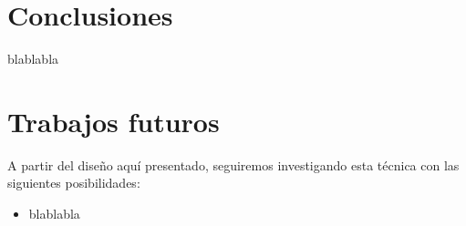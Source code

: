 \documentclass[conference,spanish,a4paper,10pt,oneside,final]{tfmpd}
\begin{document}
%
%
%
%
%
\section{Conclusiones}
blablabla
%
%
%
%
%
%
\section{Trabajos futuros}
A partir del diseño aquí presentado, seguiremos investigando esta técnica con las siguientes
posibilidades:
\begin{itemize}
\item blablabla
\end{itemize}

\nocite{*}


\end{document}
